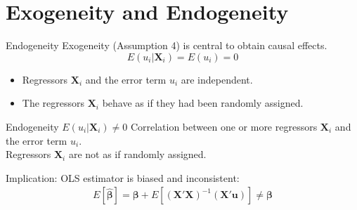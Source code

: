 \documentclass[11pt, aspectratio = 169]{beamer}
\begin{document}

\section{Exogeneity and Endogeneity}

\begin{frame}{Endogeneity}
Exogeneity (Assumption 4) is central to obtain causal effects.
$$E(u_i|\boldsymbol{X}_i) = E(u_i) = 0$$
\begin{itemize}
    \item Regressors $\boldsymbol{X}_i$ and the error term $u_i$ are independent.
    \item The regressors $\boldsymbol{X}_i$ behave as if they had been randomly assigned. 
\end{itemize}
\pause
\begin{block}{Endogeneity $E(u_i|\boldsymbol{X}_i) \neq 0$}
    \vspace{2mm}
    Correlation between one or more regressors $\boldsymbol{X}_i$ and the error term $u_i$. \\
    Regressors $\boldsymbol{X}_i$ are \alert{not} as if randomly assigned.
\end{block}
\pause
Implication: OLS estimator is biased and inconsistent: 
\begin{align*}
E[\hat{\boldsymbol{\beta} }] = \boldsymbol{\beta}  + E[(\boldsymbol{X}'\boldsymbol{X})^{-1}(\boldsymbol{X}'\boldsymbol{u})]  \neq \boldsymbol{\beta}
\end{align*}
\end{frame}
\end{document}
